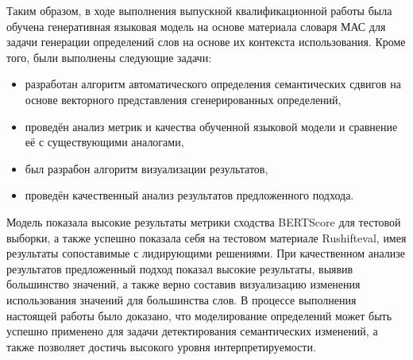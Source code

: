 \documentclass[LI,VKR]{HSEUniversity}
\begin{document}
Таким образом, в ходе выполнения выпускной квалификационной работы была обучена генеративная языковая модель
на основе материала словаря МАС для задачи генерации определений слов на основе их
контекста использования.
Кроме того, были выполнены следующие задачи:
\begin{itemize}
    \item разработан алгоритм автоматического определения семантических сдвигов на
основе векторного представления сгенерированных определений,
    \item проведён анализ метрик и качества обученной языковой модели и
сравнение её с существующими аналогами,
    \item был разрабон алгоритм визуализации результатов,
    \item проведён качественный анализ результатов предложенного подхода.
\end{itemize}

Модель показала высокие результаты метрики сходства BERTScore для тестовой выборки,
а также успешно показала себя на тестовом материале Rushifteval,
имея результаты сопоставимые с лидирующими решениями.
При качественном анализе результатов предложенный подход показал высокие результаты, выявив большинство значений,
а также верно составив визуализацию изменения использования значений для большинства слов.
В процессе выполнения настоящей работы было доказано, что моделирование определений может быть
успешно применено для задачи детектирования семантических изменений,
а также позволяет достичь высокого уровня интерпретируемости.

\end{document}
